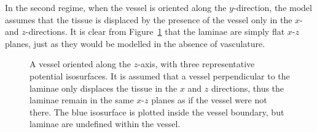   In the second regime, when the vessel is oriented along the $y$-direction, the model assumes that the tissue is displaced by the presence of the vessel only in the $x$- and $z$-directions. It is clear from Figure~\ref{fig:perpendicular} that the laminae are simply flat $x$-$z$ planes, just as they would be modelled in the absence of vasculature.
  
  \begin{figure}[htbp]
    \centering
    \caption{A vessel oriented along the $z$-axis, with three representative potential isosurfaces. It is assumed that a vessel perpendicular to the laminae only displaces the tissue in the $x$ and $z$ directions, thus the laminae remain in the same $x$-$z$ planes as if the vessel were not there. The blue isosurface is plotted inside the vessel boundary, but laminae are undefined within the vessel.}
    \label{fig:perpendicular}
  \end{figure}

